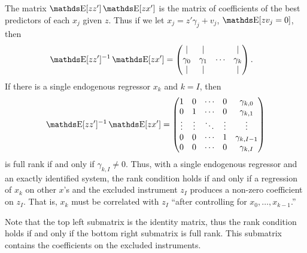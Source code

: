 \documentclass[letterpaper, 10pt]{article}
\begin{document}
The matrix \(\E[zz']\E[zx']\) is the matrix of coefficients of the best predictors of each  \(x_j\) given \(z\).
Thus if we let \(x_j = z' \gamma_j + v_j\),  \(\E[zv_j = 0]\), then
\begin{align*}
  \E[zz']^{-1} \E[zx']
  &= \pmat{
    | & | &  & | \\
    \gamma_0 & \gamma_1 & \cdots & \gamma_k \\
    | & | &  & |
  }.
\end{align*}
If there is a single endogenous regressor \(x_k\) and \(k = I\), then
\[
  \E[zz']^{-1} \E[zx'] = \pmat{
    1 & 0 & \cdots & 0 & \gamma_{k, 0} \\
    0 & 1 & \cdots & 0 & \gamma_{k, 1} \\
    \vdots & \vdots & \ddots & \vdots & \vdots \\
    0 & 0 & \cdots & 1 & \gamma_{k, I - 1} \\
    0 & 0 & \cdots & 0 & \gamma_{k, I}
  }
\]
is full rank if and only if \(\gamma_{k, I} \neq 0\).
Thus, with a single endogenous regressor and an exactly identified system, the rank condition holds if and only if a regression of \(x_k\) on other \(x\)'s and the excluded instrument \(z_I\) produces a non-zero coefficient on \(z_I\).
That is, \(x_k\) must be correlated with \(z_I\) ``after controlling for \(x_0, \dots, x_{k - 1}\).''

Note that the top left submatrix is the identity matrix, thus the rank condition holds if and only if the bottom right submatrix is full rank.
This submatrix contains the coefficients on the excluded instruments.
\end{document}
